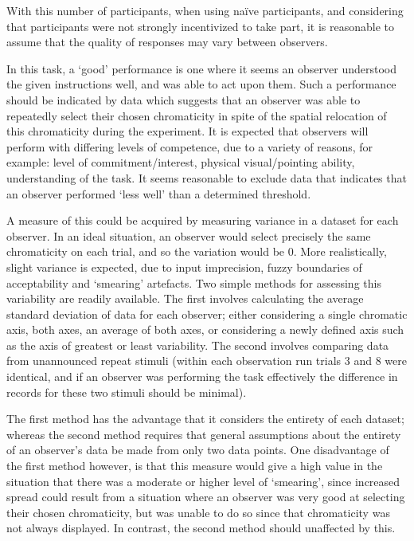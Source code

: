 
With this number of participants, when using naïve participants, and considering that participants were not strongly incentivized to take part, it is reasonable to assume that the quality of responses may vary between observers.

In this task, a `good' performance is one where it seems an observer understood the given instructions well, and was able to act upon them. Such a performance should be indicated by data which suggests that an observer was able to repeatedly select their chosen chromaticity in spite of the spatial relocation of this chromaticity during the experiment. It is expected that observers will perform with differing levels of competence, due to a variety of reasons, for example: level of commitment/interest, physical visual/pointing ability, understanding of the task. It seems reasonable to exclude data that indicates that an observer performed `less well' than a determined threshold.

A measure of this could be acquired by measuring variance in a dataset for each observer. In an ideal situation, an observer would select precisely the same chromaticity on each trial, and so the variation would be 0. More realistically, slight variance is expected, due to input imprecision, fuzzy boundaries of acceptability and `smearing' artefacts.
Two simple methods for assessing this variability are readily available. The first involves calculating the average standard deviation of data for each observer; either considering a single chromatic axis, both axes, an average of both axes, or considering a newly defined axis such as the axis of greatest or least variability. The second involves comparing data from unannounced repeat stimuli (within each observation run trials 3 and 8 were identical, and if an observer was performing the task effectively the difference in records for these two stimuli should be minimal).


The first method has the advantage that it considers the entirety of each dataset; whereas the second method requires that general assumptions about the entirety of an observer's data be made from only two data points. One disadvantage of the first method however, is that this measure would give a high value in the situation that there was a moderate or higher level of `smearing', since increased spread could result from a situation where an observer was very good at selecting their chosen chromaticity, but was unable to do so since that chromaticity was not always displayed. In contrast, the second method should unaffected by this.

